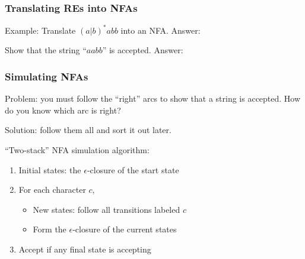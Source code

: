 \documentclass{plt}
\begin{document}
\begin{frame}[fragile=singleslide]
  \frametitle{Translating REs into NFAs}

Example: Translate $(a|b)^*abb$ into an NFA. Answer:


Show that the string ``$aabb$'' is accepted. Answer:


\end{frame}

\begin{frame}
  \frametitle{Simulating NFAs}

Problem: you must follow the ``right'' arcs to show that a string is
accepted.  How do you know which arc is right?

Solution: follow them all and sort it out later.

``Two-stack'' NFA simulation algorithm:

\begin{enumerate}
\item Initial states: the $\epsilon$-closure of the start state
\item For each character $c$,
\begin{itemize}
\item New states: follow all transitions labeled $c$
\item Form the $\epsilon$-closure of the current states
\end{itemize}
\item Accept if any final state is accepting
\end{enumerate}

\end{frame}
\end{document}
